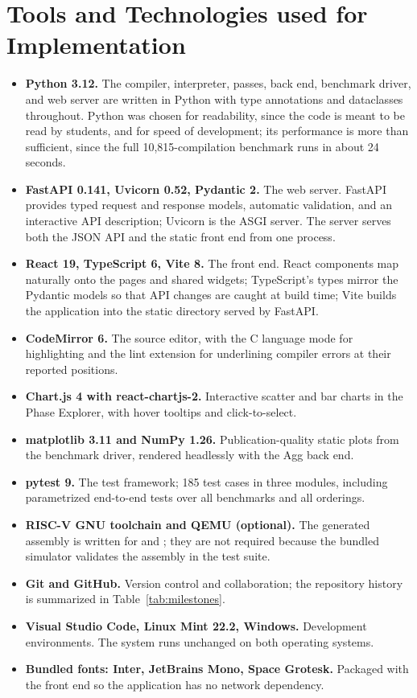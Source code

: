 \section{Tools and Technologies used for Implementation}

\begin{itemize}
  \item \textbf{Python 3.12.} The compiler, interpreter, passes, back end, benchmark driver, and web server are written in Python with type annotations and dataclasses throughout. Python was chosen for readability, since the code is meant to be read by students, and for speed of development; its performance is more than sufficient, since the full 10{,}815-compilation benchmark runs in about 24 seconds.
  \item \textbf{FastAPI 0.141, Uvicorn 0.52, Pydantic 2.} The web server. FastAPI provides typed request and response models, automatic validation, and an interactive API description; Uvicorn is the ASGI server. The server serves both the JSON API and the static front end from one process.
  \item \textbf{React 19, TypeScript 6, Vite 8.} The front end. React components map naturally onto the pages and shared widgets; TypeScript's types mirror the Pydantic models so that API changes are caught at build time; Vite builds the application into the static directory served by FastAPI.
  \item \textbf{CodeMirror 6.} The source editor, with the C language mode for highlighting and the lint extension for underlining compiler errors at their reported positions.
  \item \textbf{Chart.js 4 with react-chartjs-2.} Interactive scatter and bar charts in the Phase Explorer, with hover tooltips and click-to-select.
  \item \textbf{matplotlib 3.11 and NumPy 1.26.} Publication-quality static plots from the benchmark driver, rendered headlessly with the Agg back end.
  \item \textbf{pytest 9.} The test framework; 185 test cases in three modules, including parametrized end-to-end tests over all benchmarks and all orderings.
  \item \textbf{RISC-V GNU toolchain and QEMU (optional).} The generated assembly is written for  and ; they are not required because the bundled simulator validates the assembly in the test suite.
  \item \textbf{Git and GitHub.} Version control and collaboration; the repository history is summarized in Table~\ref{tab:milestones}.
  \item \textbf{Visual Studio Code, Linux Mint 22.2, Windows.} Development environments. The system runs unchanged on both operating systems.
  \item \textbf{Bundled fonts: Inter, JetBrains Mono, Space Grotesk.} Packaged with the front end so the application has no network dependency.
\end{itemize}
